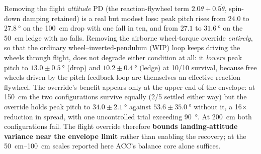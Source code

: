 \documentclass[a4paper,fleqn]{cas-dc}
\begin{document}
Removing the flight \emph{attitude} PD (the reaction-flywheel term
$2.0\theta + 0.5\dot\theta$, spin-down damping retained) is a real but modest
loss: peak pitch rises from $24.0$ to $\SI{27.8}{\degree}$ on the \SI{100}{cm}
drop with one fall in ten, and from $27.1$ to $\SI{31.6}{\degree}$ on the
\SI{50}{cm} ledge with no falls. Removing the airborne wheel-torque override \emph{entirely}, so that the ordinary wheel--inverted-pendulum (WIP) loop keeps driving the wheels through flight, does not degrade either condition at all: it
\emph{lowers} peak pitch to $13.0{\pm}\SI{0.5}{\degree}$ (drop) and
$10.2{\pm}\SI{0.4}{\degree}$ (ledge) at 10/10 survival, because free wheels
driven by the pitch-feedback loop are themselves an effective reaction flywheel.
The override's benefit appears only at the upper end of the envelope: at
\SI{150}{cm} the two configurations survive equally (2/5 settled either way) but
the override holds peak pitch to $34.0{\pm}\SI{2.1}{\degree}$ against
$53.6{\pm}\SI{35.0}{\degree}$ without it, a \num{16}$\times$ reduction in
spread, with one uncontrolled trial exceeding \SI{90}{\degree}. At \SI{200}{cm}
both configurations fail. The flight override therefore \textbf{bounds
landing-attitude variance near the envelope limit} rather than enabling the
recovery; at the \SIrange{50}{100}{cm} scales reported here ACC's balance core
alone suffices.
\end{document}
